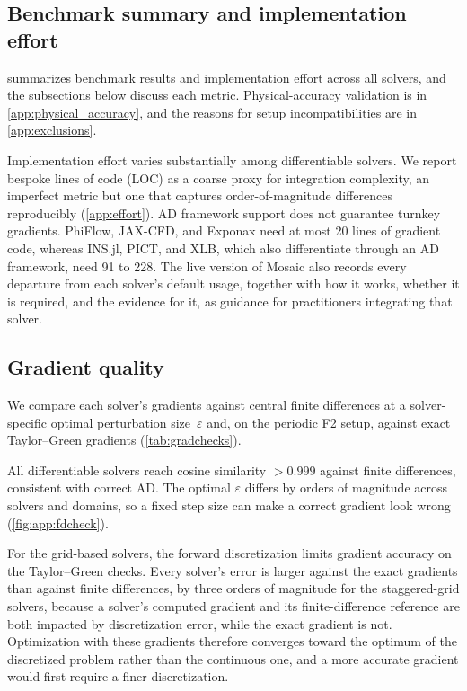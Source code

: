 \subsection{Benchmark summary and implementation effort}
\label{sec:baselines}

 summarizes benchmark results and implementation
effort across all solvers, and the subsections below discuss each metric.
Physical-accuracy validation is in \cref{app:physical_accuracy}, and the
reasons for setup incompatibilities are in \cref{app:exclusions}.

Implementation effort varies substantially among differentiable solvers.
We report bespoke lines of code (LOC) as a coarse proxy for integration
complexity, an imperfect metric but one that captures order-of-magnitude
differences reproducibly (\cref{app:effort}).
AD framework support does not guarantee turnkey gradients. PhiFlow, JAX-CFD,
and Exponax need at most 20 lines of gradient code, whereas INS.jl, PICT, and
XLB, which also differentiate through an AD framework, need 91 to 228.
The live version of Mosaic also records every departure from each solver's
default usage, together with how it works, whether it is required, and the
evidence for it, as guidance for practitioners integrating that solver.



\subsection{Gradient quality}
\label{sec:quality}

We compare each solver's gradients against central finite differences at a
solver-specific optimal perturbation size~$\varepsilon$ and, on the periodic
F2 setup, against exact Taylor--Green gradients (\cref{tab:gradchecks}).



All differentiable solvers reach cosine similarity $>0.999$ against finite
differences, consistent with correct AD. The optimal $\varepsilon$ differs by
orders of magnitude across solvers and domains, so a fixed step size can make
a correct gradient look wrong (\cref{fig:app:fdcheck}).

For the grid-based solvers, the forward discretization limits gradient
accuracy on the Taylor--Green checks. Every solver's error is larger against the
exact gradients than against finite differences, by three orders of magnitude
for the staggered-grid solvers, because a solver's computed gradient and its finite-difference
reference are both impacted by discretization error, while the exact gradient is not.
Optimization with these gradients therefore converges toward the optimum of the discretized problem
rather than the continuous one, and a more accurate gradient would first require a finer discretization.

